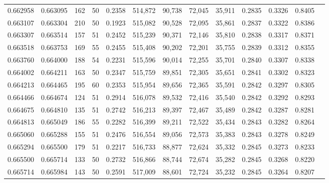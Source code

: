 \begin{tabular}{rrrrrrrrrrrrr}
0.662958 & 0.663095 &   162 &  50 &                                     0.2358 & 514,872 &  90,738 &  72,045 &  35,911 & 0.2835 & 0.3326 & 0.8405 \\
0.663107 & 0.663304 &   210 &  50 &                                     0.1923 & 515,082 &  90,528 &  72,095 &  35,861 & 0.2837 & 0.3322 & 0.8386 \\
0.663307 & 0.663514 &   157 &  51 &                                     0.2452 & 515,239 &  90,371 &  72,146 &  35,810 & 0.2838 & 0.3317 & 0.8371 \\
0.663518 & 0.663753 &   169 &  55 &                                     0.2455 & 515,408 &  90,202 &  72,201 &  35,755 & 0.2839 & 0.3312 & 0.8355 \\
0.663760 & 0.664000 &   188 &  54 &                                     0.2231 & 515,596 &  90,014 &  72,255 &  35,701 & 0.2840 & 0.3307 & 0.8338 \\
0.664002 & 0.664211 &   163 &  50 &                                     0.2347 & 515,759 &  89,851 &  72,305 &  35,651 & 0.2841 & 0.3302 & 0.8323 \\
0.664213 & 0.664465 &   195 &  60 &                                     0.2353 & 515,954 &  89,656 &  72,365 &  35,591 & 0.2842 & 0.3297 & 0.8305 \\
0.664466 & 0.664674 &   124 &  51 &                                     0.2914 & 516,078 &  89,532 &  72,416 &  35,540 & 0.2842 & 0.3292 & 0.8293 \\
0.664675 & 0.664810 &   135 &  51 &                                     0.2742 & 516,213 &  89,397 &  72,467 &  35,489 & 0.2842 & 0.3287 & 0.8281 \\
0.664813 & 0.665049 &   186 &  55 &                                     0.2282 & 516,399 &  89,211 &  72,522 &  35,434 & 0.2843 & 0.3282 & 0.8264 \\
0.665060 & 0.665288 &   155 &  51 &                                     0.2476 & 516,554 &  89,056 &  72,573 &  35,383 & 0.2843 & 0.3278 & 0.8249 \\
0.665294 & 0.665500 &   179 &  51 &                                     0.2217 & 516,733 &  88,877 &  72,624 &  35,332 & 0.2845 & 0.3273 & 0.8233 \\
0.665500 & 0.665714 &   133 &  50 &                                     0.2732 & 516,866 &  88,744 &  72,674 &  35,282 & 0.2845 & 0.3268 & 0.8220 \\
0.665714 & 0.665984 &   143 &  50 &                                     0.2591 & 517,009 &  88,601 &  72,724 &  35,232 & 0.2845 & 0.3264 & 0.8207 \\

\end{tabular}
